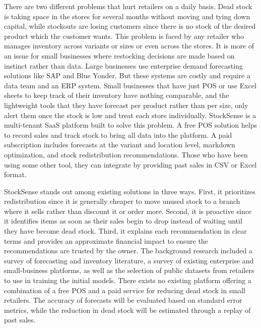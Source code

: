 \documentclass{StockSense}
\begin{document}
There are two different problems that hurt retailers on a daily basis. Dead stock is taking space in the stores for several months without moving and tying down capital, while stockouts are losing customers since there is no stock of the desired product which the customer wants. This problem is faced by any retailer who manages inventory across variants or sizes or even across the stores. It is more of an issue for small businesses where restocking decisions are made based on instinct rather than data. Large businesses use enterprise demand forecasting solutions like SAP and Blue Yonder. But these systems are costly and require a data team and an ERP system. Small businesses that have just POS or use Excel sheets to keep track of their inventory have nothing comparable, and the lightweight tools that they have forecast per product rather than per size, only alert them once the stock is low and treat each store individually. StockSense is a multi-tenant SaaS platform built to solve this problem. A free POS solution helps to record sales and track stock to bring all data into the platform. A paid subscription includes forecasts at the variant and location level, markdown optimization, and stock redistribution recommendations. Those who have been using some other tool, they can integrate by providing past sales in CSV or Excel format.

StockSense stands out among existing solutions in three ways. First, it prioritizes redistribution since it is generally cheaper to move unused stock to a branch where it sells rather than discount it or order more. Second, it is proactive since it identifies items as soon as their sales begin to drop instead of waiting until they have become dead stock. Third, it explains each recommendation in clear terms and provides an approximate financial impact to ensure the recommendations are trusted by the owner. The background research included a survey of forecasting and inventory literature, a survey of existing enterprise and small-business platforms, as well as the selection of public datasets from retailers to use in training the initial models. There exists no existing platform offering a combination of a free POS and a paid service for reducing dead stock in small retailers. The accuracy of forecasts will be evaluated based on standard error metrics, while the reduction in dead stock will be estimated through a replay of past sales.

\pagebreak

\end{document}
